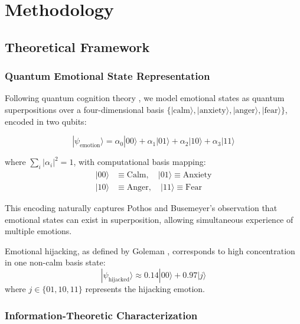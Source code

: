 \documentclass[11pt,letterpaper]{article}
\newcommand{\ket}[1]{|#1\rangle}
\begin{document}
\section{Methodology}
\label{sec:methods}

\subsection{Theoretical Framework}

\subsubsection{Quantum Emotional State Representation}

Following quantum cognition theory \cite{busemeyer2012quantum,aerts2009quantum}, we model emotional states as quantum superpositions over a four-dimensional basis $\{\ket{\text{calm}}, \ket{\text{anxiety}}, \ket{\text{anger}}, \ket{\text{fear}}\}$, encoded in two qubits:

\begin{equation}
\ket{\psi_{\text{emotion}}} = \alpha_0\ket{00} + \alpha_1\ket{01} + \alpha_2\ket{10} + \alpha_3\ket{11}
\label{eq:emotion_state}
\end{equation}

where $\sum_i |\alpha_i|^2 = 1$, with computational basis mapping:
\begin{align}
\ket{00} &\equiv \text{Calm},\quad \ket{01} \equiv \text{Anxiety} \nonumber\\
\ket{10} &\equiv \text{Anger},\quad \ket{11} \equiv \text{Fear}
\end{align}

This encoding naturally captures Pothos and Busemeyer's \cite{pothos2013can} observation that emotional states can exist in superposition, allowing simultaneous experience of multiple emotions.

Emotional hijacking, as defined by Goleman \cite{goleman1995emotional}, corresponds to high concentration in one non-calm basis state:
\begin{equation}
\ket{\psi_{\text{hijacked}}} \approx 0.14\ket{00} + 0.97\ket{j}
\label{eq:hijacked_state}
\end{equation}
where $j \in \{01, 10, 11\}$ represents the hijacking emotion.

\subsubsection{Information-Theoretic Characterization}
\end{document}
